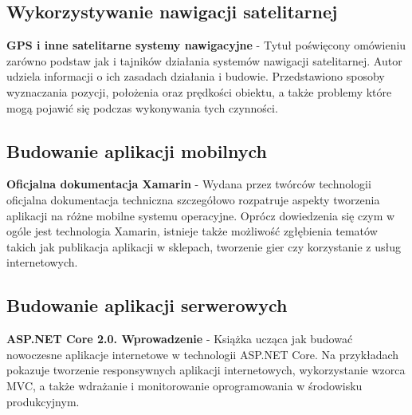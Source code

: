 \subsection{Wykorzystywanie nawigacji satelitarnej}
\textbf{GPS i inne satelitarne systemy nawigacyjne} \cite{gps2} - Tytuł poświęcony omówieniu zarówno podstaw jak i tajników działania systemów nawigacji satelitarnej. Autor udziela informacji o ich zasadach działania i budowie. Przedstawiono sposoby wyznaczania pozycji, położenia oraz prędkości obiektu, a także problemy które mogą pojawić się podczas wykonywania tych czynności.
\subsection{Budowanie aplikacji mobilnych}
\textbf{Oficjalna dokumentacja Xamarin} \cite{xamarin_docs_real} - Wydana przez twórców technologii oficjalna dokumentacja techniczna szczegółowo rozpatruje aspekty tworzenia aplikacji na różne mobilne systemu operacyjne. Oprócz dowiedzenia się czym w ogóle jest technologia Xamarin, istnieje także możliwość zgłębienia tematów takich jak publikacja aplikacji w sklepach, tworzenie gier czy korzystanie z usług internetowych.
\subsection{Budowanie aplikacji serwerowych}
\textbf{ASP.NET Core 2.0. Wprowadzenie} \cite{ksiazka-asp-core} - Książka ucząca jak budować nowoczesne aplikacje internetowe w technologii ASP.NET Core. Na przykładach pokazuje tworzenie responsywnych aplikacji internetowych, wykorzystanie wzorca MVC, a także wdrażanie i monitorowanie oprogramowania w środowisku produkcyjnym.
